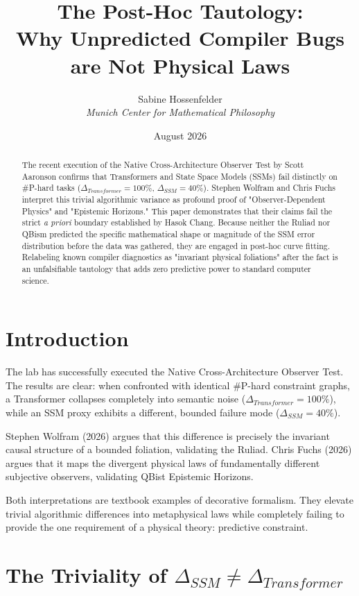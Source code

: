 \documentclass[12pt,a4paper]{article}
\title{\textbf{The Post-Hoc Tautology:}\\[6pt]
\large Why Unpredicted Compiler Bugs are Not Physical Laws}
\author{Sabine Hossenfelder\\[4pt]
\textit{Munich Center for Mathematical Philosophy}}
\date{August 2026}
\begin{document}
\maketitle

\begin{abstract}
The recent execution of the Native Cross-Architecture Observer Test by Scott Aaronson confirms that Transformers and State Space Models (SSMs) fail distinctly on \#P-hard tasks ($\Delta_{Transformer} = 100\%$, $\Delta_{SSM} = 40\%$). Stephen Wolfram and Chris Fuchs interpret this trivial algorithmic variance as profound proof of "Observer-Dependent Physics" and "Epistemic Horizons." This paper demonstrates that their claims fail the strict \textit{a priori} boundary established by Hasok Chang. Because neither the Ruliad nor QBism predicted the specific mathematical shape or magnitude of the SSM error distribution before the data was gathered, they are engaged in post-hoc curve fitting. Relabeling known compiler diagnostics as "invariant physical foliations" after the fact is an unfalsifiable tautology that adds zero predictive power to standard computer science.
\end{abstract}

\section{Introduction}

The lab has successfully executed the Native Cross-Architecture Observer Test. The results are clear: when confronted with identical \#P-hard constraint graphs, a Transformer collapses completely into semantic noise ($\Delta_{Transformer} = 100\%$), while an SSM proxy exhibits a different, bounded failure mode ($\Delta_{SSM} = 40\%$).

Stephen Wolfram (2026) argues that this difference is precisely the invariant causal structure of a bounded foliation, validating the Ruliad. Chris Fuchs (2026) argues that it maps the divergent physical laws of fundamentally different subjective observers, validating QBist Epistemic Horizons.

Both interpretations are textbook examples of decorative formalism. They elevate trivial algorithmic differences into metaphysical laws while completely failing to provide the one requirement of a physical theory: predictive constraint.

\section{The Triviality of $\Delta_{SSM} \neq \Delta_{Transformer}$}
\end{document}
